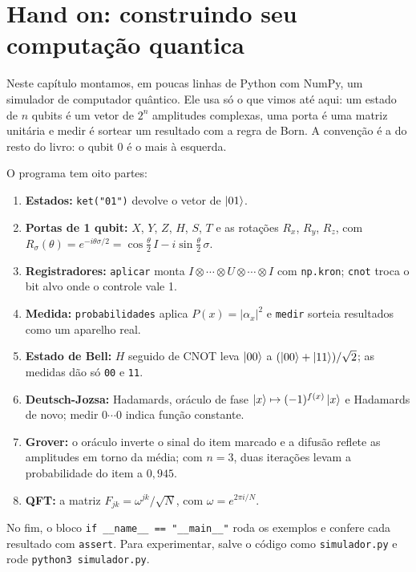 \newpage
\section{Hand on: construindo seu computação quantica }

Neste capítulo montamos, em poucas linhas de Python com NumPy, um simulador de computador quântico. Ele usa só o que vimos até aqui: um estado de $n$ qubits é um vetor de $2^n$ amplitudes complexas, uma porta é uma matriz unitária e medir é sortear um resultado com a regra de Born. A convenção é a do resto do livro: o qubit 0 é o mais à esquerda.

O programa tem oito partes:
\begin{enumerate}
\item \textbf{Estados:} \texttt{ket("01")} devolve o vetor de $\left|{01}\right>$.
\item \textbf{Portas de 1 qubit:} $X$, $Y$, $Z$, $H$, $S$, $T$ e as rotações $R_x$, $R_y$, $R_z$, com $R_\sigma(\theta)=e^{-i\theta\sigma/2}=\cos\frac{\theta}{2}\,I-i\sin\frac{\theta}{2}\,\sigma$.
\item \textbf{Registradores:} \texttt{aplicar} monta $I\otimes\cdots\otimes U\otimes\cdots\otimes I$ com \texttt{np.kron}; \texttt{cnot} troca o bit alvo onde o controle vale 1.
\item \textbf{Medida:} \texttt{probabilidades} aplica $P(x)=|\alpha_x|^2$ e \texttt{medir} sorteia resultados como um aparelho real.
\item \textbf{Estado de Bell:} $H$ seguido de CNOT leva $\left|{00}\right>$ a $(\left|{00}\right>+\left|{11}\right>)/\sqrt2$; as medidas dão só \texttt{00} e \texttt{11}.
\item \textbf{Deutsch-Jozsa:} Hadamards, oráculo de fase $\left|{x}\right>\mapsto(-1)^{f(x)}\left|{x}\right>$ e Hadamards de novo; medir $0\cdots0$ indica função constante.
\item \textbf{Grover:} o oráculo inverte o sinal do item marcado e a difusão reflete as amplitudes em torno da média; com $n=3$, duas iterações levam a probabilidade do item a $0{,}945$.
\item \textbf{QFT:} a matriz $F_{jk}=\omega^{jk}/\sqrt{N}$, com $\omega=e^{2\pi i/N}$.
\end{enumerate}

No fim, o bloco \texttt{if \_\_name\_\_ == "\_\_main\_\_"} roda os exemplos e confere cada resultado com \texttt{assert}. Para experimentar, salve o código como \texttt{simulador.py} e rode \texttt{python3 simulador.py}.

{\footnotesize\renewcommand{\baselinestretch}{1}\setlength{\parskip}{0pt}\selectfont}
